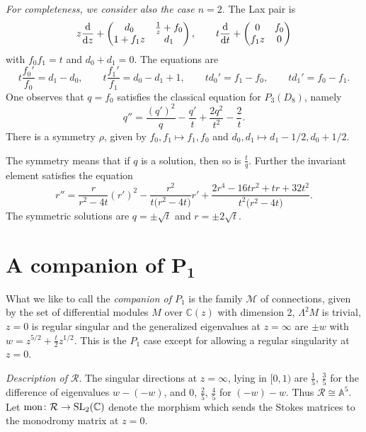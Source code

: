 \documentclass[pdftex]{sigma}
\numberwithin{equation}{section}
\begin{document}
 {\it For completeness, we consider also the case $n=2$}.
The Lax pair is
\[
z\frac{{\rm d}}{{\rm d}z}+\begin{pmatrix}
d_0&\frac{1}{z}+f_0\\
1+f_1z&d_1\end{pmatrix},\qquad
t\frac{{\rm d}}{{\rm d}t}+\begin{pmatrix}0& f_0\\
f_1z & 0
\end{pmatrix}
\]
 with
$f_0f_1=t$ and $d_0+d_1=0$. The equations are
\[t\frac{f_0'}{f_0}=d_1-d_0,\qquad t\frac{f_1'}{f_1}=d_0-d_1+1, \qquad td_0'=f_1-f_0,\qquad td_1'=f_0-f_1.\]
One observes that $q=f_0$ satisfies the classical equation for $P_3(D_8)$, namely{\samepage
\[
q''=\frac{(q')^2}{q}-\frac{q'}{t}+\frac{2q^2}{t^2}-\frac{2}{t}.
\]
There is a symmetry $\rho$, given by $f_0,f_1\mapsto f_1,f_0$ and $d_0, d_1\mapsto d_1-1/2, d_0+1/2$.}


 The symmetry means that if $q$ is a solution, then so is $\frac{t}{q}$. Further the invariant element  satisfies the equation
 \[ r''=\frac{r}{r^2-4t}(r')^2-\frac{r^2}{t\bigl(r^2-4t\bigr)}r'+\frac{2r^4-16tr^2+tr+32t^2}{t^2\bigl(r^2-4t\bigr)}. \]
 The symmetric solutions are $q=\pm \sqrt{t}$ and $r=\pm 2\sqrt{t}$.

\section[A companion of P\_1]{A companion of $\boldsymbol{P_1}$} \label{thirteen}

What we like to call the {\it companion of $P_1$} is the family $\mathcal{M}$ of connections, given by the set of differential modules $M$ over
$\mathbb{C}(z)$ with dimension 2, $\Lambda ^2M$ is trivial, $z=0$ is regular singular and the generalized eigenvalues at $z=\infty$ are $\pm w$ with
$w=z^{5/2}+\frac{t}{2}z^{1/2}$. This is the $P_1$ case except for allowing a regular singularity at $z=0$.



 {\it Description of $\mathcal{R}$}. The singular directions at $z=\infty$, lying in $[0,1)$
are $\frac{1}{5}$, $\frac{3}{5}$ for the difference of eigenvalues $w-(-w)$, and $0$, $\frac{2}{5}$, $\frac{4}{5}$ for
$(-w)-w$. Thus $\mathcal{R}\cong \mathbb{A}^5$. Let $\operatorname{mon}\colon \mathcal{R}\rightarrow {\rm SL}_2(\mathbb{C})$
 denote the morphism which sends the Stokes matrices to the monodromy matrix at $z=0$.
\end{document}
